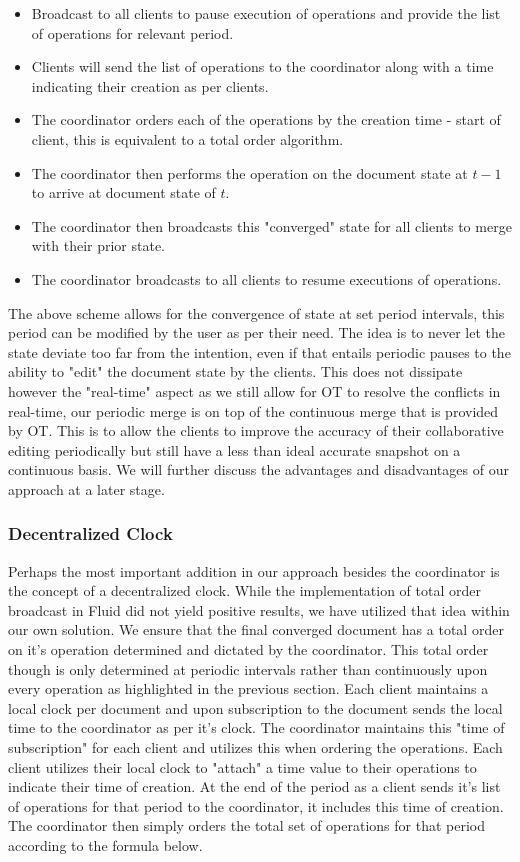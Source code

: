 \documentclass[9pt, titlepage]{article}
\begin{document}
  \begin{itemize}
    \item Broadcast to all clients to pause execution of operations and provide the list of operations for relevant period.
    \item Clients will send the list of operations to the coordinator along with a time indicating their creation as per clients.
    \item The coordinator orders each of the operations by the creation time - start of client, this is equivalent to a total order algorithm.
    \item The coordinator then performs the operation on the document state at \(t-1\) to arrive at document state of \(t\).
    \item The coordinator then broadcasts this "converged" state for all clients to merge with their prior state.
    \item The coordinator broadcasts to all clients to resume executions of operations.
  \end{itemize}

  The above scheme allows for the convergence of state at set period intervals, this period can be modified by the user as per their need.
  The idea is to never let the state deviate too far from the intention, even if that entails periodic pauses to the ability to "edit"
  the document state by the clients. This does not dissipate however the "real-time" aspect as we still allow for OT to resolve the conflicts
  in real-time, our periodic merge is on top of the continuous merge that is provided by OT. This is to allow the clients to improve the
  accuracy of their collaborative editing periodically but still have a less than ideal accurate snapshot on a continuous basis. We will
  further discuss the advantages and disadvantages of our approach at a later stage.

  \subsubsection{Decentralized Clock}
  Perhaps the most important addition in our approach besides the coordinator is the concept of a decentralized clock. While the 
  implementation of total order broadcast in Fluid did not yield positive results, we have utilized that idea within our own solution.
  We ensure that the final converged document has a total order on it's operation determined and dictated by the coordinator. This total 
  order though is only determined at periodic intervals rather than continuously upon every operation as highlighted in the previous section.
  Each client maintains a local clock per document and upon subscription to the document sends the local time to the coordinator as per 
  it's clock. The coordinator maintains this "time of subscription" for each client and utilizes this when ordering the operations. Each
  client utilizes their local clock to "attach" a time value to their operations to indicate their time of creation. At the end of the
  period as a client sends it's list of operations for that period to the coordinator, it includes this time of creation. The coordinator
  then simply orders the total set of operations for that period according to the formula below.
\end{document}
